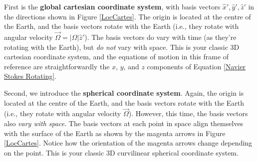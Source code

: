 First is the \textbf{global cartesian coordinate system}, with basis vectors \(\hat{x}',\hat{y}',\hat{z}'\) in the directions shown in Figure \ref{LocCartes}. The origin is located at the centre of the Earth, and the basis vectors rotate with the Earth (i.e., they rotate with angular velocity \(\vec{\Omega}=|\Omega|\hat{z}'\)). The basis vectors do vary with time (as they're rotating with the Earth), but \textit{do not} vary with space. This is your classic 3D cartesian coordinate system, and the equations of motion in this frame of reference are straightforwardly the \(x\), \(y\), and \(z\) components of Equation \ref{Navier Stokes Rotating}.

Second, we introduce the \textbf{spherical coordinate system}. Again, the origin is located at the centre of the Earth, and the basis vectors rotate with the Earth (i.e., they rotate with angular velocity \(\vec{\Omega}\)). However, this time, the basis vectors also \textit{vary with space}. The basis vectors at each point in space align themselves with the surface of the Earth as shown by the magenta arrows in Figure \ref{LocCartes}. Notice how the orientation of the magenta arrows change depending on the point. This is your classic 3D curvilinear spherical coordinate system.


